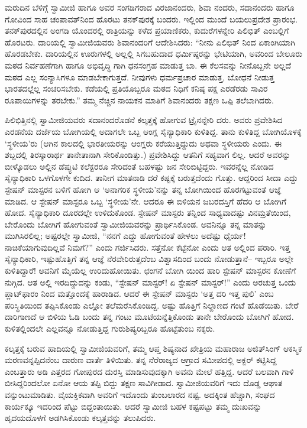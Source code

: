 ಮರುದಿನ ಬೆಳಿಗ್ಗೆ ಸ್ವಾಮೀಜಿ ಹಾಗೂ ಅವರ ಸಂಗಡಿಗರಾದ ವಿರಜಾನಂದರು, ಶಿವಾ ನಂದರು, ಸದಾನಂದರು ಹಾಗೂ ಗೋವಿಂದ ಸಾಹ ಚಂಪಾವತ್​ನಿಂದ ಹೊರಟು ತನಕ್​ಪುರಕ್ಕೆ ಬಂದರು. ಇಲ್ಲಿಂದ ಮುಂದೆ ಬಯಲುಪ್ರದೇಶ ಪ್ರಾರಂಭ. ತನಕ್​ಪುರದಲ್ಲಿನ ಅಂಗಡಿ ಯೊಂದರಲ್ಲಿ ರಾತ್ರಿಯನ್ನು ಕಳೆದ ಪ್ರಯಾಣಿಕರು, ಕುದುರೆಗಳನ್ನೇರಿ ಪಿಲಿಭಿತ್ ಎಂಬಲ್ಲಿಗೆ ಹೊರಟರು. ದಾರಿಯಲ್ಲಿ ಸ್ವಾಮೀಜಿಯವರು ಶಿವಾನಂದರಿಗೆ ಆದೇಶಿಸಿದರು: “ನೀನು ಪಿಲಿಭಿತ್ ನಿಂದ ಏಕಾಂಗಿಯಾಗಿ ಹೊರಡಬೇಕು. ದಾರಿಯಲ್ಲಿನ ಊರುಗಳಲ್ಲಿ ಅಲ್ಲಲ್ಲಿ ಸಿಗಬಹುದಾದ ಧರ್ಮಿಷ್ಠರನ್ನು ಭೇಟಿಯಾಗಿ, ಅವರಿಂದ ಬೇಲೂರು ಮಠದ ನಿರ್ವಹಣೆಗಾಗಿ ಹಾಗೂ ಅಭಿವೃದ್ಧಿ ಗಾಗಿ ಧನಸಂಗ್ರಹ ಮಾಡುತ್ತ ಬಾ. ಈ ಕೆಲಸವನ್ನು ನೀನೊಬ್ಬನೇ ಅಲ್ಲದೆ ಮಠದ ಎಲ್ಲ ಸಂನ್ಯಾಸಿಗಳೂ ಮಾಡಬೇಕಾಗುತ್ತದೆ. ನೀವುಗಳು ಧರ್ಮಪ್ರಚಾರ ಮಾಡುತ್ತ, ಬೋಧನೆ ನೀಡುತ್ತ ಭಾರತದಲ್ಲೆಲ್ಲ ಸಂಚರಿಸಬೇಕು. ಕಡೆಯಲ್ಲಿ ಪ್ರತಿಯೊಬ್ಬರೂ ಮಠದ ನಿಧಿಗೆ ಕನಿಷ್ಠ ಪಕ್ಷ ಎರಡೆರಡು ಸಾವಿರ ರೂಪಾಯಿಗಳನ್ನು ತರಬೇಕು.” ತಮ್ಮ ನೆಚ್ಚಿನ ನಾಯಕನ ಮಾತಿಗೆ ಶಿವಾನಂದರು ತಕ್ಷಣ ಒಪ್ಪಿ ತಲೆಬಾಗಿದರು.

ಪಿಲಿಭಿತ್ತಿನಲ್ಲಿ ಸ್ವಾಮೀಜಿಯವರು ಸದಾನಂದರೊಡನೆ ಕಲ್ಕತ್ತಕ್ಕೆ ಹೋಗುವ ಟ್ರೈನನ್ನೇರಿ ದರು. ಅವರು ಪ್ರವೇಶಿಸಿದ ಎರಡನೆಯ ದರ್ಜೆಯ ಬೋಗಿಯಲ್ಲಿ ಅದಾಗಲೇ ಒಬ್ಬ ಆಂಗ್ಲ ಸೈನ್ಯಾಧಿಕಾರಿ ಕುಳಿತಿದ್ದ. ತಾನು ಕುಳಿತಿದ್ದ ಬೋಗಿಯೊಳಕ್ಕೆ ‘ಸ್ಥಳೀಯ’ರು (ಆಗಿನ ಕಾಲದಲ್ಲಿ ಭಾರತೀಯರನ್ನು ಆಂಗ್ಲರು ಕರೆಯುತ್ತಿದ್ದುದು  ಅಥವಾ ಸ್ಥಳೀಯರು ಎಂದು. ಈ ಶಬ್ದದಲ್ಲಿ ತಿರಸ್ಕಾರಾರ್ಥ ತಾನೇತಾನಾಗಿ ಸೇರಿಕೊಂಡಿತ್ತು.) ಪ್ರವೇಶಿಸಿದ್ದು ಆತನಿಗೆ ಸಹ್ಯವಾಗ ಲಿಲ್ಲ. ಆದರೆ ಅವರನ್ನು ಬೀಳ್ಕೊಡಲು ಅಲ್ಲಿನ ಡೆಪ್ಯುಟಿ ಕಲೆಕ್ಟರರೂ ಸೇರಿದಂತೆ ಬಹಳಷ್ಟು ಜನ ಸೇರಿಬಿಟ್ಟಿದ್ದರು. ಇವರನ್ನೆಲ್ಲ ನೋಡಿದ ಸೈನ್ಯಾಧಿಕಾರಿ ಒಳಗೊಳಗೇ ಕುದಿದ. ತಾನೀಗ ಮಾತನಾಡಿ ದರೆ ಕಷ್ಟಕ್ಕೆ ಬರುತ್ತದೆಂದು ಗೊತ್ತು. ಆದ್ದರಿಂದ ಸೀದಾ ಎದ್ದು ಸ್ಟೇಷನ್ ಮಾಸ್ಟರನ ಬಳಿಗೆ ಹೋಗಿ ಆ ‘ಅನಾಗರಿಕ ಸ್ಥಳೀಯ’ನನ್ನು ತನ್ನ ಬೋಗಿಯಿಂದ ಹೊರಗಟ್ಟುವಂತೆ ಆಜ್ಞೆ ಮಾಡಿದ. ಆ ಸ್ಟೇಷನ್ ಮಾಸ್ಟರೂ ಒಬ್ಬ ‘ಸ್ಥಳೀಯ’ನೇ. ಆದರೂ ಈ ಬಿಳಿಯನ ಜಬರದಸ್ತಿಗೆ ಹೆದರಿ ಆ ಬೋಗಿಗೆ ಹೋದ. ಸೈನ್ಯಾಧಿಕಾರಿ ದೂರದಲ್ಲೇ ಉಳಿದುಕೊಂಡ. ಸ್ಟೇಷನ್ ಮಾಸ್ಟರು ತನ್ನಿಂದ ಸಾಧ್ಯವಾದಷ್ಟು ವಿನಮ್ರತೆಯಿಂದ, ಬೇರೊಂದು ಬೋಗಿಗೆ ಹೋಗುವಂತೆ ಸ್ವಾಮೀಜಿಯವರನ್ನು ಪ್ರಾರ್ಥಿಸಿಕೊಂಡ. ಅವನಿನ್ನೂ ತನ್ನ ಮಾತನ್ನು ಮುಗಿಸಿರಲಿಲ್ಲ; ಅಷ್ಟರಲ್ಲೇ ಸ್ವಾಮೀಜಿ, “ನನಗೆ ಎದ್ದು ಹೋಗುವಂತೆ ಹೇಳಲು ಅದೆಷ್ಟು ಧೈರ್ಯ! ನಾಚಿಕೆಯಾಗುವುದಿಲ್ಲವೆ ನಿಮಗೆ?” ಎಂದು ಗರ್ಜಿಸಿದರು. ಸತ್ತೆನೋ ಕೆಟ್ಟೆನೋ ಎಂದು ಆತ ಅಲ್ಲಿಂದ ಪರಾರಿ. ಇತ್ತ ಸೈನ್ಯಾಧಿಕಾರಿ, ಇಷ್ಟುಹೊತ್ತಿಗೆ ತನ್ನ ಆಜ್ಞೆ ನೆರವೇರಿರುತ್ತದೆಂಬ ವಿಶ್ವಾಸದಿಂದ ಬಂದು ನೋಡುತ್ತಾನೆ– ಇಬ್ಬರೂ ಅಲ್ಲೇ ಕುಳಿತಿದ್ದಾರೆ! ಅವನಿಗೆ ಮೈಯೆಲ್ಲ ಉರಿದುಹೋಯಿತು. ಛಂಗನೆ ಬೋಗಿ ಯಿಂದ ಹಾರಿ ಸ್ಟೇಷನ್ ಮಾಸ್ಟರನ ಕೋಣೆಗೆ ನುಗ್ಗಿದ. ಆತ ಅಲ್ಲಿ ಇರದಿದ್ದುದನ್ನು ಕಂಡು, “ಸ್ಟೇಷನ್ ಮಾಸ್ಟರ್! ಏ ಸ್ಟೇಷನ್ ಮಾಸ್ಟರ್!” ಎಂದು ಅರಚುತ್ತ ಒಂದು ಪ್ಲಾಟ್​ಫಾರಂ ನಿಂದ ಮತ್ತೊಂದಕ್ಕೆ ಹಾರಾಡಿದ. ಆದರೆ ಈ ಸ್ಟೇಷನ್ ಮಾಸ್ಟರು ‘ಅತ್ತ ದರಿ ಇತ್ತ ಪುಲಿ’ ಎಂಬ ಪರಿಸ್ಥಿತಿಯಿಂದ ತಪ್ಪಿಸಿಕೊಂಡು ಎಲ್ಲೋ ತಲೆಮರೆಸಿಕೊಂಡಿದ್ದ. ಅಷ್ಟು ಹೊತ್ತಿಗೆ ನಿಲ್ದಾಣದ ಗಂಟೆ ಹೊಡೆಯಿತು. ಬೇರೆ ದಾರಿಗಾಣದೆ ಆ ಬಿಳಿಯ ಓಡಿ ಬಂದು ತನ್ನ ಗಂಟು ಮೂಟೆಯನ್ನೆತ್ತಿಕೊಂಡು ತಾನೇ ಬೇರೊಂದು ಬೋಗಿಗೆ ಹೋದ. ಕುಳಿತಲ್ಲಿಂದಲೇ ಎಲ್ಲವನ್ನೂ ನೋಡುತ್ತಿದ್ದ ಗುರುಶಿಷ್ಯರಿಬ್ಬರೂ ಹೊಟ್ಟೆತುಂಬ ನಕ್ಕರು.

ಕಲ್ಕತ್ತಕ್ಕೆ ಬರುವ ಹಾದಿಯಲ್ಲಿ ಸ್ವಾಮೀಜಿಯವರಿಗೆ, ತಮ್ಮ ಆಪ್ತ ಶಿಷ್ಯನಾದ ಖೇತ್ರಿಯ ಮಹಾರಾಜ ಅಜಿತ್​ಸಿಂಗ್ ಆಕಸ್ಮಿಕ ಮರಣವನ್ನಪ್ಪಿದನೆಂಬ ದಾರುಣ ವಾರ್ತೆ ತಿಳಿಯಿತು. ತನ್ನ ನೆರೆರಾಜ್ಯದ ಆಗ್ರಾದ ಸಮೀಪದಲ್ಲಿ ಅಕ್ಬರ್ ಕಟ್ಟಿಸಿದ್ದ ಎಂಬತ್ತಾರು ಅಡಿ ಎತ್ತರದ ಗೋಪುರದ ದುರಸ್ತಿ ಮಾಡಿಸುವುದಕ್ಕಾಗಿ ಅವನು ಮೇಲೆ ಹತ್ತಿದ್ದ. ಆದರೆ ಬಲವಾಗಿ ಗಾಳಿ ಬೀಸಿದ್ದರಿಂದಲೋ ಏನೋ ಆಯ ತಪ್ಪಿ ಬಿದ್ದು ತಕ್ಷಣ ಸಾವಿಗೀಡಾದ. ಸ್ವಾಮೀಜಿಯವರಿಗೆ ಇದು ದೊಡ್ಡ ಆಘಾತ ವನ್ನುಂಟುಮಾಡಿತು. ವೈಯಕ್ತಿಕವಾಗಿ ಅವರಿಗೆ ಇದೊಂದು ತುಂಬಲಾರದ ನಷ್ಟ. ಅದಕ್ಕಿಂತ ಹೆಚ್ಚಾಗಿ, ಸಂಘದ ಕಾರ್ಯಕ್ಕೂ ಇದರಿಂದ ಪೆಟ್ಟು ಬಿದ್ದಂತಾಯಿತು. ಆದರೆ ಸ್ವಾಮೀಜಿ ಬಹಳ ಕಷ್ಟಪಟ್ಟು ತಮ್ಮ ದುಃಖವನ್ನು ಹೃದಯದೊಳಗೆ ಅಡಗಿಸಿಕೊಂಡು ಕಲ್ಕತ್ತವನ್ನು ತಲುಪಿದರು.

